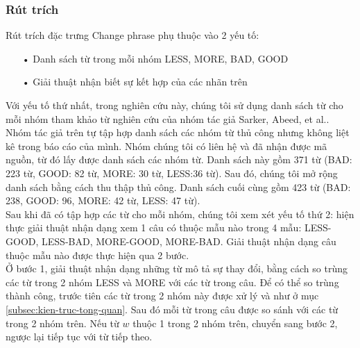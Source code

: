 \subsubsection*{Rút trích}
Rút trích đặc trưng Change phrase phụ thuộc vào 2 yếu tố:
\begin{itemize}
\item[•] Danh sách từ trong mỗi nhóm LESS, MORE, BAD, GOOD
\item[•] Giải thuật nhận biết sự kết hợp của các nhãn trên
\end{itemize}
Với yếu tố thứ nhất, trong nghiên cứu này, chúng tôi sử dụng danh sách từ cho mỗi nhóm tham khảo từ nghiên cứu của nhóm tác giả Sarker, Abeed, et al.\cite{sarker2011outcome}. Nhóm tác giả trên tự tập hợp danh sách các nhóm từ thủ công nhưng không liệt kê trong báo cáo của mình. Nhóm chúng tôi có liên hệ và đã nhận được mã nguồn, từ đó lấy được danh sách các nhóm từ. Danh sách này gồm 371 từ (BAD: 223 từ, GOOD: 82 từ, MORE: 30 từ, LESS:36 từ). Sau đó, chúng tôi mở rộng danh sách bằng cách thu thập thủ công. Danh sách cuối cùng gồm 423 từ (BAD: 238, GOOD: 96, MORE: 42 từ, LESS: 47 từ).\\

Sau khi đã có tập hợp các từ cho mỗi nhóm, chúng tôi xem xét yếu tố thứ 2: hiện thực giải thuật nhận dạng xem 1 câu có thuộc mẫu nào trong 4 mẫu: LESS-GOOD, LESS-BAD, MORE-GOOD, MORE-BAD. Giải thuật nhận dạng câu thuộc mẫu nào được thực hiện qua 2 bước.\\

Ở bước 1, giải thuật nhận dạng những từ mô tả sự thay đổi, bằng cách so trùng các từ trong 2 nhóm LESS và MORE với các từ trong câu. Để có thể so trùng thành công, trước tiên các từ trong 2 nhóm này được xử lý  và  như ở mục \ref{subsec:kien-truc-tong-quan}. Sau đó mỗi từ trong câu được so sánh với các từ trong 2 nhóm trên.  Nếu từ $w$ thuộc 1 trong 2 nhóm trên, chuyển sang bước 2, ngược lại tiếp tục với từ tiếp theo.\\


